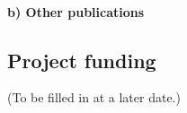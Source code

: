 \documentclass[11pt]{article}
\begin{document}

\nocite{StevensEtAl2017}
\nocite{TonhauserEtAl2013}
\nocite{TonhauserEtAl2018}
\nocite{DeMarneffeEtAl2019}
\nocite{Tonhauser2012}
\nocite{DegenTonhauserMS}
\nocite{KiparskyTonhauser2013}

\nocite{MalsburgEtAl2020}
\nocite{MalsburgVasishth2013}
\nocite{MalsburgAngele2017}

\printbibliography[heading=none,keyword={TMJT-own}]

\paragraph{b) Other publications}

\printbibliography[heading=none,keyword={TMJT-own-other}]

\subsection{Project funding} %

(To be filled in at a later date.)
\end{document}
